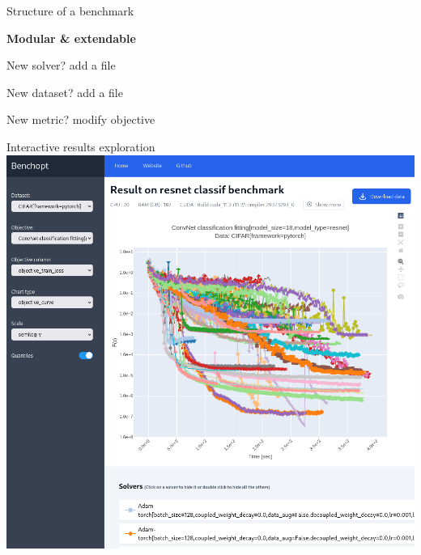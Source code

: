 \documentclass[unknownkeysallowed]{beamer}
\begin{document}
\begin{frame}{Structure of a benchmark}

    \begin{minipage}{0.45\linewidth}
    \end{minipage}
    \begin{minipage}{0.45\linewidth}

    \textbf{Modular \& extendable}
    \vspace*{5mm}

    New solver? add a file

    New dataset? add a file

    New metric? modify objective
    \end{minipage}

\end{frame}

\begin{frame}{Interactive results exploration}
    \centering
    \includegraphics[width=0.8\linewidth]{../sharedimages/benchopt_convnet.png}
\end{frame}
\end{document}
